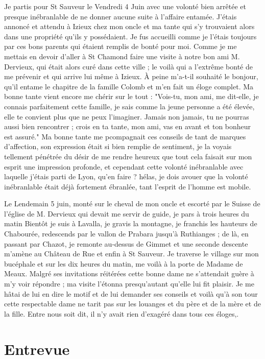 \documentclass[11pt,a4paper]{report}
\begin{document}
Je partis pour St Sauveur le Vendredi 4 Juin avec une volonté bien arrêtée et presque inébranlable de ne donner aucune suite à l'affaire entamée. J'étais annoncé et attendu à Izieux chez mon oncle et ma tante qui s'y trouvaient alors dans une propriété qu'ils y possédaient. Je fus accueilli comme je l'étais toujours par ces bons parents qui étaient remplis de bonté pour moi. Comme je me mettais en devoir d'aller à St Chamond faire une visite à notre bon ami M. Dervieux, qui était alors curé dans cette ville ; le voilà qui a l'extrême bonté de me prévenir et qui arrive lui même à Izieux. À peine m'a-t-il souhaité le bonjour, qu'il entame le chapitre de la famille Colomb et m'en fait un éloge complet. Ma bonne tante vient encore me chérir sur le tout : "Vois-tu, mon ami, me dit-elle, je connais parfaitement cette famille, je sais comme la jeune personne a été élevée, elle te convient plus que ne peux l'imaginer. Jamais non jamais, tu ne pourras aussi bien rencontrer ; crois en ta tante, mon ami, vas en avant et ton bonheur est assuré." Ma bonne tante me pcompagnait ces conseils de tant de marques d'affection, son expression était si bien remplie de sentiment, je la voyais tellement pénétrée du désir de me rendre heureux que tout cela faisait sur mon esprit une impression profonde, et cependant cette volonté inébranlable avec laquelle j'étais parti de Lyon, qu'en faire ? hélas, je dois avouer que la volonté inébranlable était déjà fortement ébranlée, tant l'esprit de l'homme est mobile.

Le Lendemain 5 juin, monté sur le cheval de mon oncle et escorté par le Suisse de l'église de M. Dervieux qui devait me servir de guide, je pars à trois heures du matin Bientôt je suis à Lavalla, je gravis la montagne, je franchis les hauteurs de Chabourée, redescends par le vallon de Prabara jusqu'à Ruthianges ; de là, en passant par Chazot, je remonte au-dessus de Gimmet et une seconde descente m'amène au Château de Rue et enfin à St Sauveur. Je traverse le village sur mon bucéphale et sur les dix heures du matin, me voilà à la porte de Madame de Meaux. Malgré ses invitations réitérées cette bonne dame ne s'attendait guère à m'y voir répondre ; ma visite l'étonna presqu'autant qu'elle lui fit plaisir. Je me hâtai de lui en dire le motif et de lui demander ses conseils et voilà qu'à son tour cette respectable dame ne tarit pas sur les louanges et du père et de la mère et de la fille. Entre nous soit dit, il n'y avait rien d'exagéré dans tous ces éloges,.

\section*{Entrevue}
\end{document}

